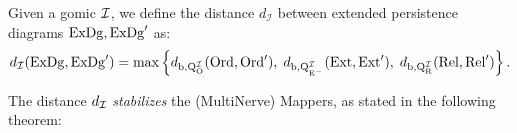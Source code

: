 \begin{defin}
Given a gomic $\mathcal{I}$, we define the distance $d_{\mathcal I}$ between extended persistence diagrams $\mathrm{ExDg},\mathrm{ExDg}'$ as:
\begin{equation}\label{eq:def-bottleneck-MMapper} 
d_{\mathcal I}(\mathrm{ExDg},\mathrm{ExDg}')=\max\left\{
d_{\rm{b},Q_O^{\mathcal{I}}}(\mathrm{Ord}, \mathrm{Ord}'),\; 
d_{\rm{b},Q_{E^-}^{\mathcal{I}}}(\mathrm{Ext}, \mathrm{Ext}'),\; 
d_{\rm{b},Q_R^{\mathcal{I}}}(\mathrm{Rel}, \mathrm{Rel}') \right\}. 
\end{equation}
\end{defin}












The distance $d_{\mathcal{I}}$ {\em stabilizes} the (MultiNerve) Mappers, as stated in the following theorem:


